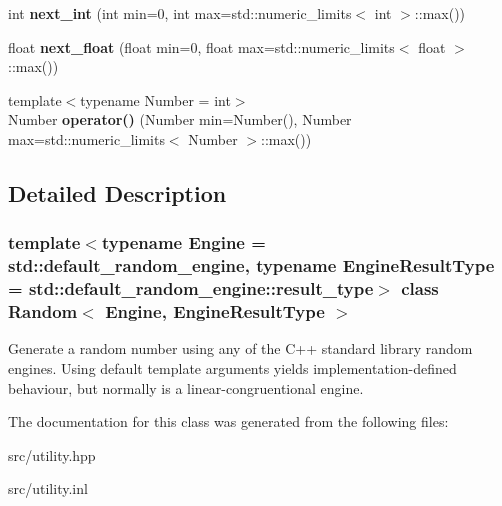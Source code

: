 \begin{DoxyCompactItemize}
\mbox{\label{class_random_a05a83eaa7ee2e2a73804b6f88efd03f7}} 
int {\bfseries next\+\_\+int} (int min=0, int max=std\+::numeric\+\_\+limits$<$ int $>$\+::max())
\item 
\mbox{\label{class_random_ab1e15e656d7750fa1175f4d2e7fcf40c}} 
float {\bfseries next\+\_\+float} (float min=0, float max=std\+::numeric\+\_\+limits$<$ float $>$\+::max())
\item 
\mbox{\label{class_random_a33b4d95938e106c260be3464125c43c2}} 
{\footnotesize template$<$typename Number  = int$>$ }\\Number {\bfseries operator()} (Number min=Number(), Number max=std\+::numeric\+\_\+limits$<$ Number $>$\+::max())
\end{DoxyCompactItemize}


\subsection{Detailed Description}
\subsubsection*{template$<$typename Engine = std\+::default\+\_\+random\+\_\+engine, typename Engine\+Result\+Type = std\+::default\+\_\+random\+\_\+engine\+::result\+\_\+type$>$\newline
class Random$<$ Engine, Engine\+Result\+Type $>$}

Generate a random number using any of the C++ standard library random engines. Using default template arguments yields implementation-\/defined behaviour, but normally is a linear-\/congruentional engine. 

The documentation for this class was generated from the following files\+:\begin{DoxyCompactItemize}
\item 
src/utility.\+hpp\item 
src/utility.\+inl\end{DoxyCompactItemize}
